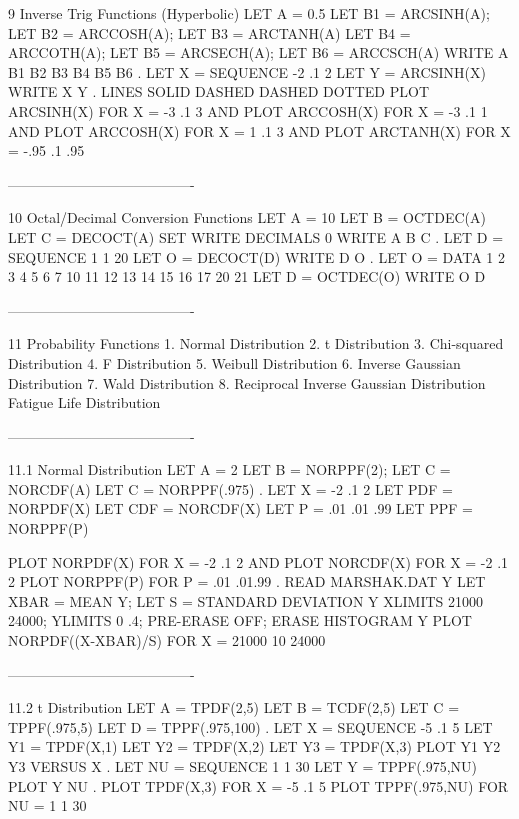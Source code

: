 9
Inverse Trig Functions (Hyperbolic)
      LET A = 0.5
      LET B1 = ARCSINH(A); LET B2 = ARCCOSH(A); LET B3 = ARCTANH(A)
      LET B4 = ARCCOTH(A); LET B5 = ARCSECH(A); LET B6 = ARCCSCH(A)
      WRITE A B1 B2 B3 B4 B5 B6
      .
      LET X = SEQUENCE -2 .1 2
      LET Y = ARCSINH(X)
      WRITE X Y
      .
      LINES SOLID DASHED DASHED DOTTED
      PLOT ARCSINH(X) FOR X = -3 .1 3 AND
      PLOT ARCCOSH(X) FOR X = -3 .1 1 AND
      PLOT ARCCOSH(X) FOR X = 1 .1 3 AND
      PLOT ARCTANH(X) FOR X = -.95 .1 .95
 
----------------------------------------
 
10
Octal/Decimal Conversion Functions
      LET A = 10
      LET B = OCTDEC(A)
      LET C = DECOCT(A)
      SET WRITE DECIMALS 0
      WRITE A B C
      .
      LET D = SEQUENCE 1 1 20
      LET O = DECOCT(D)
      WRITE D O
      .
      LET O = DATA 1 2 3 4 5 6 7 10 11 12 13 14 15 16 17 20 21
      LET D = OCTDEC(O)
      WRITE O D
 
----------------------------------------
 
11
Probability Functions
   1. Normal Distribution
   2. t Distribution
   3. Chi-squared Distribution
   4. F Distribution
   5. Weibull Distribution
   6. Inverse Gaussian Distribution
   7. Wald Distribution
   8. Reciprocal Inverse Gaussian Distribution
    Fatigue Life Distribution
 
----------------------------------------
 
11.1
Normal Distribution
      LET A = 2
      LET B = NORPPF(2); LET C = NORCDF(A)
      LET C = NORPPF(.975)
      .
      LET X = -2 .1 2
      LET PDF = NORPDF(X)
      LET CDF = NORCDF(X)
      LET P = .01 .01 .99
      LET PPF = NORPPF(P)
 
      PLOT NORPDF(X) FOR X = -2 .1 2 AND
      PLOT NORCDF(X) FOR X = -2 .1 2
      PLOT NORPPF(P) FOR P = .01 .01.99
      .
      READ MARSHAK.DAT Y
      LET XBAR = MEAN Y; LET S = STANDARD DEVIATION Y
      XLIMITS 21000 24000; YLIMITS 0 .4; PRE-ERASE OFF; ERASE
      HISTOGRAM Y
      PLOT NORPDF((X-XBAR)/S) FOR X = 21000 10 24000
 
----------------------------------------
 
11.2
t Distribution
      LET A = TPDF(2,5)
      LET B = TCDF(2,5)
      LET C = TPPF(.975,5)
      LET D = TPPF(.975,100)
      .
      LET X = SEQUENCE -5 .1 5
      LET Y1 = TPDF(X,1)
      LET Y2 = TPDF(X,2)
      LET Y3 = TPDF(X,3)
      PLOT Y1 Y2 Y3 VERSUS X
      .
      LET NU = SEQUENCE 1 1 30
      LET Y = TPPF(.975,NU)
      PLOT Y NU
      .
      PLOT TPDF(X,3) FOR X = -5 .1 5
      PLOT TPPF(.975,NU) FOR NU = 1 1 30
 
